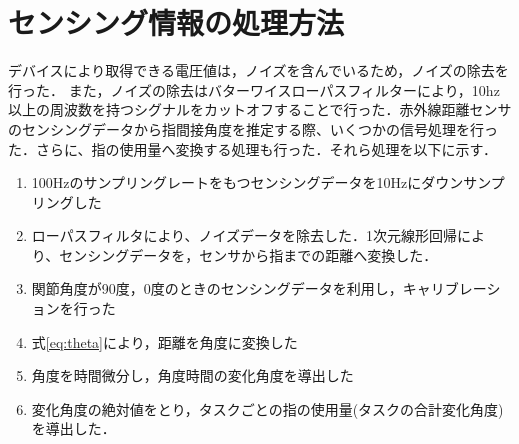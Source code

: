 \section{センシング情報の処理方法}
デバイスにより取得できる電圧値は，ノイズを含んでいるため，ノイズの除去を行った．
また，ノイズの除去はバターワイスローパスフィルターにより，10hz以上の周波数を持つシグナルをカットオフすることで行った．赤外線距離センサのセンシングデータから指間接角度を推定する際、いくつかの信号処理を行った．さらに、指の使用量へ変換する処理も行った．それら処理を以下に示す．

\begin{enumerate}
 \item 100Hzのサンプリングレートをもつセンシングデータを10Hzにダウンサンプリングした
 \item  ローパスフィルタにより、ノイズデータを除去した．1次元線形回帰により、センシングデータを，センサから指までの距離へ変換した．
 \item 関節角度が90度，0度のときのセンシングデータを利用し，キャリブレーションを行った
 \item 式\ref{eq:theta}により，距離を角度に変換した
 \item 角度を時間微分し，角度時間の変化角度を導出した
 \item 変化角度の絶対値をとり，タスクごとの指の使用量(タスクの合計変化角度)を導出した．
\end{enumerate}
